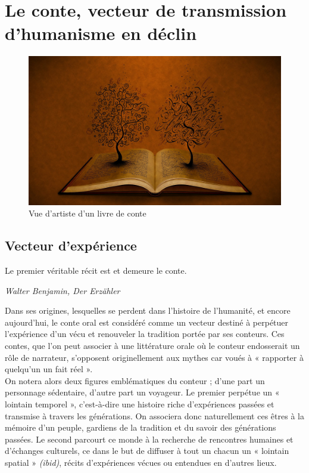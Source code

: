 \section{Le conte, vecteur de transmission d'humanisme en déclin}

\begin{figure}[h!]
    \centering
    \includegraphics[width=0.80\linewidth]{img/tale_book.jpg}
    \caption{Vue d'artiste d'un livre de conte}
\end{figure}

\subsection{Vecteur d'expérience}
\begin{shadequote}
Le premier véritable récit est et demeure le conte. \par\emph{Walter Benjamin, Der Erzähler}
\end{shadequote}

Dans ses origines, lesquelles se perdent dans l'histoire de l'humanité, et encore aujourd'hui, le conte oral est considéré comme un vecteur destiné à perpétuer l'expérience d'un vécu et renouveler la tradition portée par ses conteurs. Ces contes, que l'on peut associer à une littérature orale où le conteur endosserait un rôle de narrateur, s'opposent originellement aux mythes car voués à « rapporter à quelqu'un un fait réel »\cite{cnrtl}.\\

On notera alors deux figures emblématiques du conteur ; d'une part un personnage sédentaire, d'autre part un voyageur. Le premier perpétue un « lointain temporel »\cite{nouss2003conteur}, c'est-à-dire une histoire riche d'expériences passées et transmise à travers les générations. On associera donc naturellement ces êtres à la mémoire d'un peuple, gardiens de la tradition et du savoir des générations passées. Le second parcourt ce monde à la recherche de rencontres humaines et d'échanges culturels, ce dans le but de diffuser à tout un chacun un « lointain spatial » \textit{(ibid)}, récits d'expériences vécues ou entendues en d'autres lieux.\\

